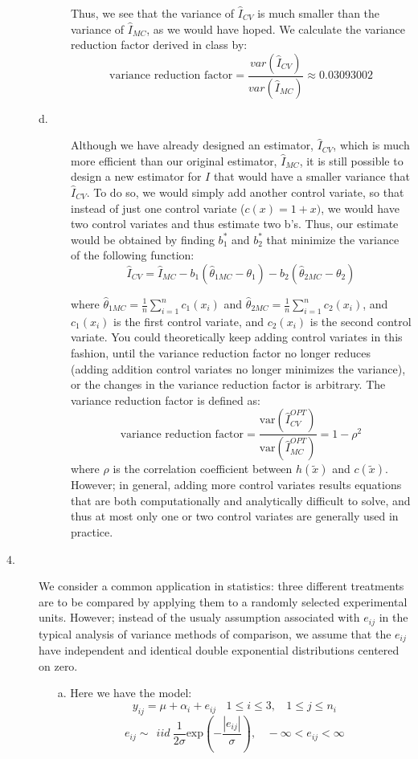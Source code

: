 \documentclass[12pt]{article}
\begin{document}
\begin{description}
\begin{description}
Thus, we see that the variance of $\hat{I}_{CV}$ is much smaller than the variance of $\hat{I}_{MC}$, as we would have hoped.  We calculate the variance reduction factor derived in class by:
\[ \text{variance reduction factor} = \frac{var(\hat{I}_{CV})}{var(\hat{I}_{MC})} \approx 0.03093002\]

\item[d.] Although we have already designed an estimator, $\hat{I}_{CV}$, which is much more efficient than our original estimator, $\hat{I}_{MC}$, it is still possible to design a new estimator for $I$ that would have a smaller variance that $\hat{I}_{CV}$. To do so, we would simply add another control variate, so that instead of just one control variate ($c(x) = 1 + x)$, we would have two control variates and thus estimate two b's. Thus, our estimate would be obtained by finding $b_1^*$ and $b_2^*$ that minimize the variance of the following function:
\[\hat{I}_{CV} = \hat{I}_{MC} - b_1(\hat{\theta}_{1MC} - \theta_1) - b_2(\hat{\theta}_{2MC} - \theta_2)\]

where $\hat{\theta}_{1MC} = \frac{1}{n} \sum_{i = 1}^n c_1(x_i)$ and $\hat{\theta}_{2MC} = \frac{1}{n} \sum_{i = 1}^n c_2(x_i)$, and $c_1(x_i)$ is the first control variate, and $c_2(x_i)$ is the second control variate. You could theoretically keep adding control variates in this fashion, until the variance reduction factor no longer reduces (adding addition control variates no longer minimizes the variance), or the changes in the variance reduction factor is arbitrary. The variance reduction factor is defined as:
\[\text{variance reduction factor} = \frac{\mathrm{var} (\hat{I}_{CV}^{OPT})}{\mathrm{var}(\hat{I}_{MC}^{OPT})} = 1 - \rho^2\]
where $\rho$ is the correlation coefficient between $h(\tilde{x})$ and $c(\tilde{x})$. However; in general, adding more control variates results equations that are both computationally and analytically difficult to solve, and thus at most only one or two control variates are generally used in practice.  
\end{description}



\item[4.] We consider a common application in statistics: three different treatments are to be compared by applying them to a randomly selected experimental units. However; instead of the usualy assumption associated with $e_{ij}$ in the typical analysis of variance methods of comparison, we assume that the $e_{ij}$  have independent and identical double exponential distributions centered on zero.
\begin{itemize}
\item[a.] Here we have the model:
\[y_{ij} = \mu + \alpha_i + e_{ij} \ \ \ \ 1 \le i \le 3, \ \ \ \ 1 \leq j \leq n_i\]
\[e_{ij} \sim \ \ iid \ \frac{1}{2\sigma} \mathrm{exp} \left(- \frac{|e_{ij}|}{\sigma} \right), \ \ \ \ -\infty < e_{ij} < \infty\]


\end{itemize}
\end{description}
\end{document}
